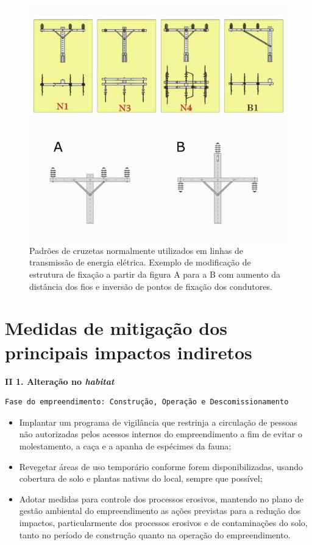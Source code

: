 \documentclass[
  oneside]{scrbook}
\providecommand{\tightlist}{%
  \setlength{\itemsep}{0pt}\setlength{\parskip}{0pt}}
\begin{document}
\begin{figure}

{\centering \includegraphics[width=0.75\linewidth]{imagens/cap05/Figura_5.2} 

}

\caption{Padrões de cruzetas normalmente utilizados em linhas de transmissão de energia elétrica. Exemplo de modificação de estrutura de fixação a partir da figura A para a B com aumento da distância dos fios e inversão de pontos de fixação dos condutores.}\label{fig:17}
\end{figure}

\hypertarget{medidas-de-mitigauxe7uxe3o-dos-principais-impactos-indiretos}{%
\section{Medidas de mitigação dos principais impactos indiretos}\label{medidas-de-mitigauxe7uxe3o-dos-principais-impactos-indiretos}}

\textbf{II 1. Alteração no \emph{habitat} }

\begin{verbatim}
Fase do empreendimento: Construção, Operação e Descomissionamento  
\end{verbatim}

\begin{itemize}
\tightlist
\item
  Implantar um programa de vigilância que restrinja a circulação de pessoas não autorizadas pelos acessos internos do empreendimento a fim de evitar o molestamento, a caça e a apanha de espécimes da fauna;
\item
  Revegetar áreas de uso temporário conforme forem disponibilizadas, usando cobertura de solo e plantas nativas do local, sempre que possível;
\item
  Adotar medidas para controle dos processos erosivos, mantendo no plano de gestão ambiental do empreendimento as ações previstas para a redução dos impactos, particularmente dos processos erosivos e de contaminações do solo, tanto no período de construção quanto na operação do empreendimento.
\end{itemize}
\end{document}

